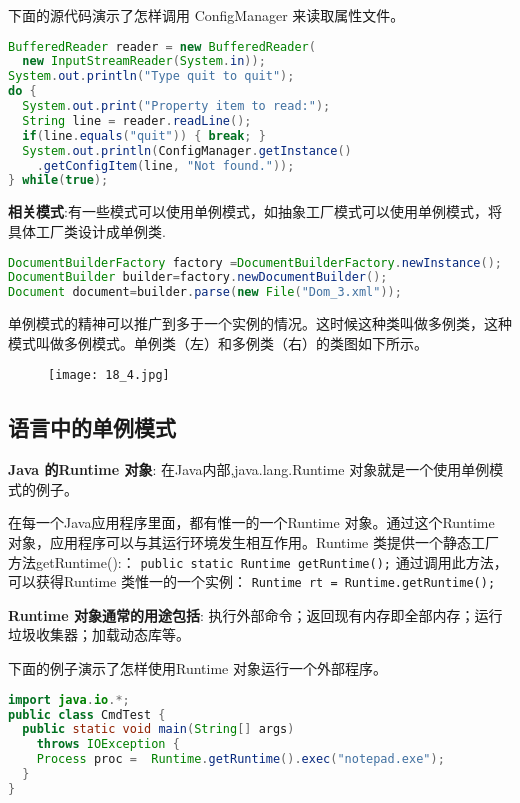 \documentclass[../main.tex]{subfiles}
\begin{document}
%
下面的源代码演示了怎样调用 ConfigManager 来读取属性文件。
\begin{lstlisting}[language=java]
BufferedReader reader = new BufferedReader(
  new InputStreamReader(System.in));
System.out.println("Type quit to quit");
do {
  System.out.print("Property item to read:");
  String line = reader.readLine();
  if(line.equals("quit")) { break; }
  System.out.println(ConfigManager.getInstance()
    .getConfigItem(line, "Not found."));
} while(true);
\end{lstlisting}
%
\textbf{相关模式}:有一些模式可以使用单例模式，如抽象工厂模式可以使用单例模式，将具体工厂类设计成单例类.
\begin{lstlisting}[language=java]
DocumentBuilderFactory factory =DocumentBuilderFactory.newInstance();
DocumentBuilder builder=factory.newDocumentBuilder();
Document document=builder.parse(new File("Dom_3.xml"));
\end{lstlisting}
%
单例模式的精神可以推广到多于一个实例的情况。这时候这种类叫做多例类，这种模式叫做多例模式。单例类（左）和多例类（右）的类图如下所示。
\begin{figure}[H]
  \texttt{[image: 18\_4.jpg]}
\end{figure}
%
\subsection{语言中的单例模式}
\noindent \textbf{Java 的Runtime 对象}:
在Java内部,java.lang.Runtime 对象就是一个使用单例模式的例子。

\noindent 在每一个Java应用程序里面，都有惟一的一个Runtime 对象。通过这个Runtime 对象，应用程序可以与其运行环境发生相互作用。Runtime 类提供一个静态工厂方法getRuntime():：
\texttt{public static Runtime getRuntime();}
通过调用此方法，可以获得Runtime 类惟一的一个实例：
\texttt{Runtime rt = Runtime.getRuntime();}

\noindent \textbf{Runtime 对象通常的用途包括}:
执行外部命令；返回现有内存即全部内存；运行垃圾收集器；加载动态库等。

\noindent 下面的例子演示了怎样使用Runtime 对象运行一个外部程序。
\begin{lstlisting}[language=java]
import java.io.*;
public class CmdTest {
  public static void main(String[] args)
    throws IOException {
    Process proc =  Runtime.getRuntime().exec("notepad.exe");
  }
}
\end{lstlisting}
\end{document}
